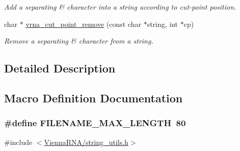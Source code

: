 \begin{DoxyCompactItemize}
\begin{DoxyCompactList}\small\item\em Add a separating \textquotesingle{}\&\textquotesingle{} character into a string according to cut-\/point position. \end{DoxyCompactList}\item 
char $\ast$ \hyperlink{group__string__utils_ga1fbd821d4408cc5f1dd9d12c15e092cb}{vrna\+\_\+cut\+\_\+point\+\_\+remove} (const char $\ast$string, int $\ast$cp)
\begin{DoxyCompactList}\small\item\em Remove a separating \textquotesingle{}\&\textquotesingle{} character from a string. \end{DoxyCompactList}\end{DoxyCompactItemize}


\subsection{Detailed Description}


\subsection{Macro Definition Documentation}
\hypertarget{group__string__utils_gafb228174279df9486a5cb56ac0bc79a3}{}
\subsubsection[{F\+I\+L\+E\+N\+A\+M\+E\+\_\+\+M\+A\+X\+\_\+\+L\+E\+N\+G\+T\+H}]{\setlength{\rightskip}{0pt plus 5cm}\#define F\+I\+L\+E\+N\+A\+M\+E\+\_\+\+M\+A\+X\+\_\+\+L\+E\+N\+G\+T\+H~80}\label{group__string__utils_gafb228174279df9486a5cb56ac0bc79a3}


{\ttfamily \#include $<$\hyperlink{string__utils_8h}{Vienna\+R\+N\+A/string\+\_\+utils.\+h}$>$}



